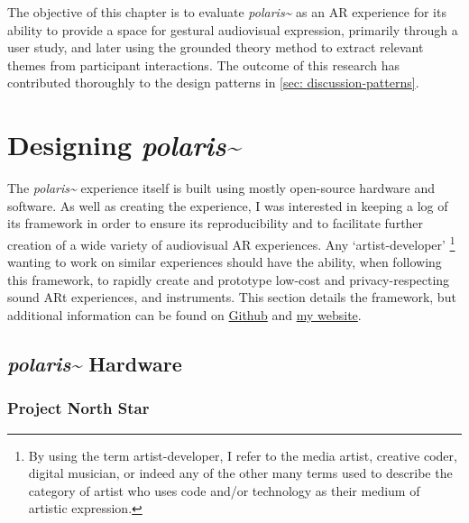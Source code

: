 The objective of this chapter is to evaluate \textit{polaris\textasciitilde{}} as an AR experience for its ability to provide a space for gestural audiovisual expression, primarily through a user study, and later using the grounded theory method to extract relevant themes from participant interactions. The outcome of this research has contributed thoroughly to the design patterns in \autoref{sec: discussion-patterns}.



\section{Designing \textit{polaris\textasciitilde{}}}\label{sec: polaris-framework}
The \textit{polaris\textasciitilde{}} experience itself is built using mostly open-source hardware and software. As well as creating the experience, I was interested in keeping a log of its framework in order to ensure its reproducibility and to facilitate further creation of a wide variety of audiovisual AR experiences. Any ‘artist-developer’ \footnote{By using the term artist-developer, I refer to the media artist, creative coder, digital musician, or indeed any of the other many terms used to describe the category of artist who uses code and/or technology as their medium of artistic expression.} wanting to work on similar experiences should have the ability, when following this framework, to rapidly create and prototype low-cost and privacy-respecting sound ARt experiences, and instruments. This section details the framework, but additional information can be found on \href{https://github.com/sambilbow/polaris}{Github} and \href{https://sambilbow.github.io}{my website}.

\subsection{\textit{polaris\textasciitilde{}} Hardware}\label{sec: polaris-framework-hardware}
\subsubsection{Project North Star}\label{sec: polaris-framework-hardware-pns}

